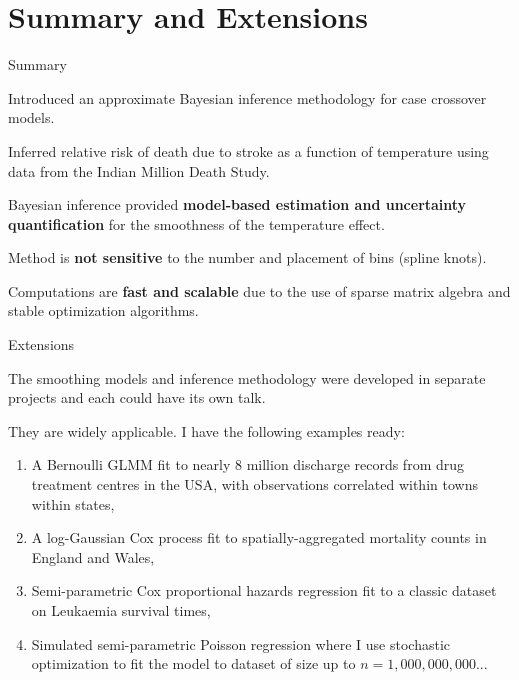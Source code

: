 \documentclass[10pt,usenames,dvipsnames,t]{beamer}
\begin{document}
\section{Summary and Extensions}

\begin{frame}{Summary}
\pause

Introduced an approximate Bayesian inference methodology for case crossover models.

\pause

Inferred relative risk of death due to stroke as a function of temperature using data from the Indian Million Death Study.

\pause

Bayesian inference provided \textbf{model-based estimation and uncertainty quantification} for the smoothness of the temperature effect.

\pause

Method is \textbf{not sensitive} to the number and placement of bins (spline knots).

\pause

Computations are \textbf{fast and scalable} due to the use of sparse matrix algebra and stable optimization algorithms.

\end{frame}

\begin{frame}{Extensions}

\pause

The smoothing models and inference methodology were developed in separate projects and each could have its own talk.

\pause

They are widely applicable. I have the following examples ready:
\pause

\begin{enumerate}
\item A Bernoulli GLMM fit to nearly $8$ million discharge records from drug treatment centres in the USA, with observations correlated within towns within states,
\pause

\item A log-Gaussian Cox process fit to spatially-aggregated mortality counts in England and Wales,
\pause

\item Semi-parametric Cox proportional hazards regression fit to a classic dataset on Leukaemia survival times,
\pause

\item Simulated semi-parametric Poisson regression where I use stochastic optimization to fit the model to dataset of size up to $n = 1,000,000,000$...
\end{enumerate}

\end{frame}
\end{document}
